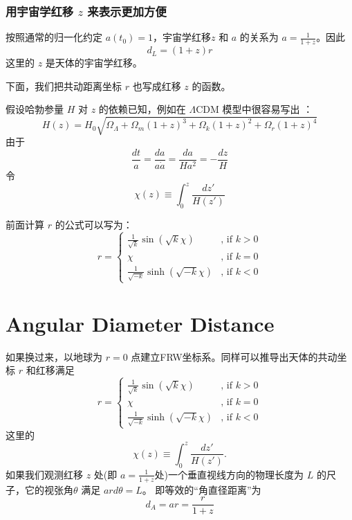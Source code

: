 \documentclass[CJK,13pt]{beamer}
\begin{document}
\begin{frame}
  \frametitle{用宇宙学红移 $z$ 来表示更加方便}
  按照通常的归一化约定 $a(t_0)=1$，宇宙学红移$z$ 和 $a$ 的关系为 $a = \frac{1}{1+z}$。因此
  $$ d_L = (1+z) r$$
  这里的 $z$ 是天体的宇宙学红移。

  \skipline
  
  下面，我们把共动距离坐标 $r$ 也写成红移 $z$ 的函数。
\end{frame}

\begin{frame}
  假设哈勃参量 $H$ 对 $z$ 的依赖已知，例如在 $\Lambda$CDM 模型中很容易写出 ：
  $$ H(z) = H_0\sqrt{\Omega_\Lambda + \Omega_m(1+z)^3  + \Omega_k(1+z)^2+\Omega_r(1+z)^4} $$
  由于
  $$\frac{dt}{a} = \frac{da}{a\dot a} = \frac{da }{Ha^2} = -\frac{dz}{H}$$
  令
  $$\chi(z) \equiv \int_0^z \frac{dz'}{H(z')} $$
  
  前面计算 $r$ 的公式可以写为：
  $$ r =   \left\{\begin{array}{ll}
  \frac{1}{\sqrt{k}}\sin{\left(\sqrt{k}\chi\right)} & \text{, if } k>0 \\
  \chi & \text{, if } k=0 \\
  \frac{1}{\sqrt{-k}}\sinh{\left(\sqrt{-k}\chi\right)} & \text{, if } k<0
  \end{array}\right.
  $$
  
\end{frame}


\section{Angular Diameter Distance}

\begin{frame}
  如果换过来，以地球为 $r=0$ 点建立FRW坐标系。同样可以推导出天体的共动坐标 $r$ 和红移满足
  $$ r =   \left\{\begin{array}{ll}
  \frac{1}{\sqrt{k}}\sin{\left(\sqrt{k}\chi\right)} & \text{, if } k>0 \\
  \chi & \text{, if } k=0 \\
  \frac{1}{\sqrt{-k}}\sinh{\left(\sqrt{-k}\chi\right)} & \text{, if } k<0
  \end{array}\right.
  $$
  这里的  
  $$\chi(z) \equiv \int_0^z \frac{dz'}{H(z')}. $$
  如果我们观测红移 $z$ 处(即 $a=\frac{1}{1+z}$处)一个垂直视线方向的物理长度为 $L$ 的尺子，它的视张角$\theta$ 满足
  $ar d\theta = L$。
  即等效的“角直径距离”为
  $$ d_A = ar = \frac{r}{1+z}$$
\end{frame}
\end{document}
